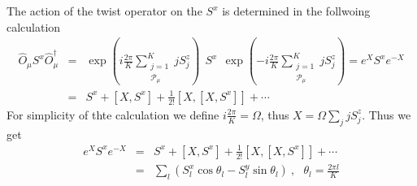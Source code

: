 \documentclass[reprint,prb,superscriptaddress]{revtex4-1}
\begin{document}
The action of the twist operator on the $S^x$ is determined in the follwoing calculation
\begin{eqnarray}
\hat{O}_{\mu} S^x \hat{O}^{\dagger}_{\mu} &=& \exp({i\frac{2\pi}{K} \displaystyle\sum_{\substack{j=1\\ \mathcal{P}_{\mu}}}^{K} j S_j^z} ) ~~S^x ~~ \exp({-i\frac{2\pi}{K} \displaystyle\sum_{\substack{j=1\\ \mathcal{P}_{\mu}}}^{K} j S_j^z} )= e^{X} S^x e^{-X} \nonumber\\
&=& S^x+[X,S^x] + \frac{1}{2!}[X,[X,S^x]] +\cdots  
\end{eqnarray}
For simplicity of thte calculation we define $i\frac{2\pi}{K}=\Omega$, thus $X=\Omega\sum_j jS^z_j$.
Thus we get
\begin{eqnarray}
e^X S^x e^{-X}&=& S^x+[X,S^x] + \frac{1}{2!}[X,[X,S^x]] +\cdots  \nonumber\\
&=& \sum_l ( S^x_l \cos \theta_l -  S_l^y \sin \theta_l ) ~,~~~\theta_l=\frac{2\pi l}{K}
\end{eqnarray}
\end{document}
